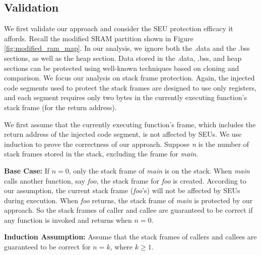 \subsection{Validation}

We first validate our approach and consider the SEU protection efficacy it affords. Recall the modified SRAM partition shown in Figure \ref{fig:modified_ram_map}. In our analysis, we ignore both the .data and the .bss sections, as well as the heap section. Data stored in the .data, .bss, and heap sections can be protected using well-known techniques based on cloning and comparison. We focus our analysis on stack frame protection. Again, the injected code segments used to protect the stack frames are designed to use only registers, and each segment requires only two bytes in the currently executing function's stack frame (for the return address).

We first assume that the currently executing function's frame, which includes the return address of the injected code segment, is not affected by SEUs. We use induction to prove the correctness of our approach. Suppose \textit{n} is the number of stack frames stored in the stack, excluding the frame for \textit{main}.

\textbf{Base Case:} If $n=0$, only the stack frame of \textit{main} is on the stack. When \textit{main} calls another function, say \textit{foo}, the stack frame for \textit{foo} is created. According to our assumption, the current stack frame (\textit{foo}'s) will not be affected by SEUs during execution. When \textit{foo} returns, the stack frame of \textit{main} is protected by our approach. So the stack frames of caller and callee are guaranteed to be correct if any function is invoked and returns when $n=0$.

\textbf{Induction Assumption:} Assume that the stack frames of callers and callees are guaranteed to be correct for $n=k$, where $k\geq 1$.

